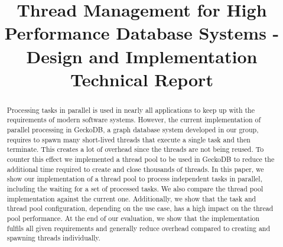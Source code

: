 \documentclass[conference]{IEEEtran}
\begin{document}



\title{Thread Management for High Performance Database Systems - Design and Implementation \\{\large Technical Report}\\}

\author{
	 \and
}

\maketitle

\begin{abstract}
        Processing tasks in parallel is used in nearly all applications to keep
        up with the requirements of modern software systems. However, the
        current implementation of parallel processing in GeckoDB, a graph database system developed in our group, requires
        to spawn many short-lived threads that execute a single task and then
        terminate. This creates a lot of overhead since the threads are not
        being reused. To counter this effect we implemented a thread pool to be
        used in GeckoDB to reduce the additional time required
        to create and close thousands of threads. In this paper, we show our
        implementation of a thread pool to process independent tasks in parallel,
        including the waiting for a set of processed tasks. We also compare the
        thread pool implementation against the current one. Additionally, we show that the task and thread pool configuration,
        depending on the use case, has a high impact on the thread
        pool performance. At the end of our evaluation, we show that the implementation 
        fulfils all given requirements and generally reduce
        overhead compared to creating and spawning threads individually.
\end{abstract}
\end{document}
